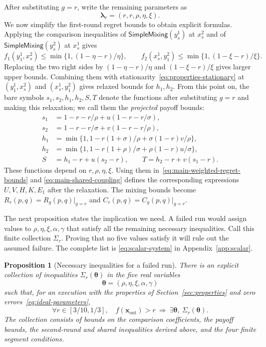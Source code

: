 \documentclass[11pt]{article}
\newtheorem{proposition}[theorem]{Proposition}
\theoremstyle{remark}
\theoremstyle{plain}
\newcommand{\sm}{\mathsf{SimpleMixing}}
\begin{document}
After substituting $g=r$, write the remaining parameters as
\begin{equation}
 \boldsymbol\lambda_r=(r,r,\rho,\eta,\xi).
 \label{eq:projected-payoff-parameters}
\end{equation}
We now simplify the first-round regret bounds to obtain explicit
formulas. Applying the comparison inequalities of $\sm(y_s^1)$
at $x_s^2$ and of $\sm(y_s^2)$ at $x_s^1$ gives
\begin{equation}
 f_1(y_1^1,x_s^2)\le\min\{1,(1-\eta-r)/\eta\},\qquad
 f_2(x_s^1,y_1^2)\le\min\{1,(1-\xi-r)/\xi\}.
 \label{eq:main-first-round-regret-bounds}
\end{equation}
Replacing the two right sides by $(1-\eta-r)/\eta$ and
$(1-\xi-r)/\xi$ gives larger upper bounds.
Combining them with stationarity~\eqref{eq:properties-stationary}
at $(y_1^1,x_s^2)$ and $(x_s^1,y_1^2)$ gives relaxed bounds
for $h_1,h_2$.
From this point on, the bare symbols $s_1,s_2,h_1,h_2,S,T$
denote the functions after substituting $g=r$ and making this
relaxation; we call them the \emph{projected} payoff bounds:
\begin{equation}
 \begin{aligned}
 s_1&=1-r-r/\rho+u(1-r-r/\sigma),\\
 s_2&=1-r-r/\sigma+v(1-r-r/\rho),\\
 h_1&=\min\{1,1-r(1+\sigma)/\rho+\sigma(1-r)v/\rho\},\\
 h_2&=\min\{1,1-r(1+\rho)/\sigma+\rho(1-r)u/\sigma\},\\
 S&=h_1-r+u(s_2-r),\qquad T=h_2-r+v(s_1-r).
 \end{aligned}
 \label{eq:main-projected-payoff-bounds}
\end{equation}
These functions depend on $r,\rho,\eta,\xi$.
Using them in~\eqref{eq:main-weighted-regret-bounds} and
\eqref{eq:main-shared-coupling} defines the corresponding expressions
$U,V,H,K,E_1$ after the relaxation. The mixing bounds become
$R_r(p,q)=R_g(p,q)|_{g=r}$ and $C_r(p,q)=C_g(p,q)|_{g=r}$.

The next proposition states the implication we need. A failed run
would assign values to $\rho,\eta,\xi,\alpha,\gamma$ that satisfy
all the remaining necessary inequalities. Call this finite
collection $\Sigma_r$. Proving that no five values satisfy it will
rule out the assumed failure. The complete list is
\eqref{eq:scalar-system} in Appendix~\ref{app:scalar}.

\begin{proposition}[Necessary inequalities for a failed run]
\label{prop:finite-system}
There is an explicit collection of inequalities $\Sigma_r(\boldsymbol\theta)$ in the
five real variables
\[
 \boldsymbol\theta=(\rho,\eta,\xi,\alpha,\gamma)
\]
such that, for an execution with the properties of
Section~\ref{sec:properties} and zero errors~\eqref{eq:ideal-parameters},
\[
 \forall r\in[3/10,1/3],\quad
 f(\boldsymbol x_{\mathrm{out}})>r
 \ \Longrightarrow\ \exists\boldsymbol\theta,\ \Sigma_r(\boldsymbol\theta).
\]
The collection consists of bounds on the comparison coefficients, the
payoff bounds, the second-round and shared inequalities derived
above, and the four finite segment conditions.
\end{proposition}
\end{document}
